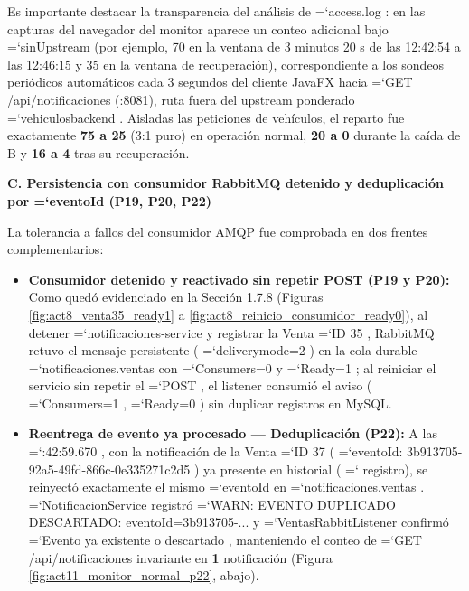 \documentclass[11pt,a4paper]{article}
\renewcommand{\_}{\oldunderscore\allowbreak}
\DeclareRobustCommand{\texttt}[1]{%
  {\upshape\ttfamily\fontsize{9}{10.8}\selectfont\hyphenchar\font=`\-\relax #1}%
}
\begin{document}
\noindent Es importante destacar la transparencia del análisis de \texttt{access.log}: en las capturas del navegador del monitor aparece un conteo adicional bajo \texttt{sinUpstream} (por ejemplo, 70 en la ventana de 3 minutos 20 s de las 12:42:54 a las 12:46:15 y 35 en la ventana de recuperación), correspondiente a los sondeos periódicos automáticos cada 3 segundos del cliente JavaFX hacia \texttt{GET /\allowbreak{}api/\allowbreak{}notificaciones} (:8081), ruta fuera del upstream ponderado \texttt{vehiculos\_backend}. Aisladas las peticiones de vehículos, el reparto fue exactamente \textbf{75 a 25} (3:1 puro) en operación normal, \textbf{20 a 0} durante la caída de B y \textbf{16 a 4} tras su recuperación.

\vspace{0.2cm}
\noindent\textbf{C. Persistencia con consumidor RabbitMQ detenido y deduplicación por \texttt{eventoId} (P19, P20, P22)}

\noindent La tolerancia a fallos del consumidor AMQP fue comprobada en dos frentes complementarios:
\begin{itemize}[leftmargin=*,itemsep=2pt,topsep=1pt]
  \item \textbf{Consumidor detenido y reactivado sin repetir POST (P19 y P20):} Como quedó evidenciado en la Sección 1.7.8 (Figuras \ref{fig:act8_venta35_ready1} a \ref{fig:act8_reinicio_consumidor_ready0}), al detener \texttt{notificaciones-service} y registrar la Venta \texttt{ID 35}, RabbitMQ retuvo el mensaje persistente (\texttt{delivery\_mode=\allowbreak{}2}) en la cola durable \texttt{notificaciones.\allowbreak{}ventas} con \texttt{Consumers=0} y \texttt{Ready=1}; al reiniciar el servicio sin repetir el \texttt{POST}, el listener consumió el aviso (\texttt{Consumers=1}, \texttt{Ready=0}) sin duplicar registros en MySQL.
  \item \textbf{Reentrega de evento ya procesado — Deduplicación (P22):} A las \texttt{12:\allowbreak{}42:\allowbreak{}59.\allowbreak{}670}, con la notificación de la Venta \texttt{ID 37} (\texttt{eventoId: 3b913705-92a5-49fd-866c-0e335271c2d5}) ya presente en historial (\texttt{1} registro), se reinyectó exactamente el mismo \texttt{eventoId} en \texttt{notificaciones.\allowbreak{}ventas}. \texttt{NotificacionService} registró \texttt{WARN: EVENTO DUPLICADO DESCARTADO: eventoId=\allowbreak{}3b913705-...} y \texttt{VentasRabbitListener} confirmó \texttt{Evento ya existente o descartado}, manteniendo el conteo de \texttt{GET /\allowbreak{}api/\allowbreak{}notificaciones} invariante en \textbf{1} notificación (Figura \ref{fig:act11_monitor_normal_p22}, abajo).
\end{itemize}
\end{document}
